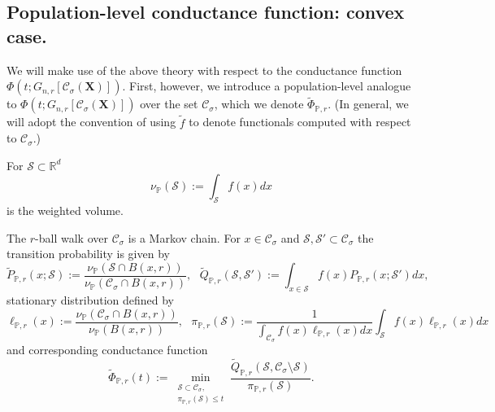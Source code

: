 \documentclass{article}
\newcommand{\Reals}{\mathbb{R}}
\newcommand{\Rd}{\Reals^d}
\newcommand{\1}{\mathbf{1}}
\newcommand{\Xbf}{\mathbf{X}}
\newcommand{\Pbb}{\mathbb{P}}
\newcommand{\Sset}{\mathcal{S}}
\newcommand{\Cset}{\mathcal{C}}
\newcommand{\Csig}{\Cset_{\sigma}}
\theoremstyle{aldenthm}
\begin{document}
\subsection{Population-level conductance function: convex case.}

We will make use of the above theory with respect to the conductance function $\Phi(t; G_{n,r}[\Csig(\Xbf)])$. First, however, we introduce a population-level analogue to $\Phi(t; G_{n,r}[\Csig(\Xbf)])$ over the set $\Csig$, which we denote $\widetilde{\Phi}_{\Pbb,r}$. (In general, we will adopt the convention of using $\widetilde{f}$ to denote functionals computed with respect to $\Csig$.)

For $\Sset \subset \Rd$
\begin{equation*}
\nu_{\Pbb}(\Sset) := \int_{\Sset} f(x) dx
\end{equation*} 
is the weighted volume.

The $r$-ball walk over $\Csig$ is a Markov chain. For $x \in \Csig$ and $\Sset, \Sset' \subset \Csig$ the transition probability is given by
\begin{equation*}
\widetilde{P}_{\Pbb, r}(x;\Sset) := \frac{\nu_\Pbb(\Sset \cap B(x,r))}{\nu_\Pbb(\Csig \cap B(x,r))}, ~~~ \widetilde{Q}_{\Pbb, r}(\Sset, \Sset') := \int_{x \in \Sset} f(x) P_{\Pbb, r}(x;\Sset') dx,
\end{equation*}
stationary distribution defined by
\begin{equation*}
\ell_{\Pbb,r}(x) := \frac{\nu_\Pbb(\Csig \cap B(x,r))}{\nu_{\Pbb}(B(x,r))}, ~~~ \pi_{\Pbb,r}(\Sset) := \frac{1}{\int_{\Csig} f(x) \ell_{\Pbb,r}(x) dx} \int_{\Sset} f(x) \ell_{\Pbb,r}(x) dx
\end{equation*}
and corresponding conductance function
\begin{equation*}
\widetilde{\Phi}_{\Pbb,r}(t) := \min_{\substack{\Sset \subset \Csig, \\ \pi_{\Pbb,r}(\Sset) \leq t} } \frac{\widetilde{Q}_{\Pbb,r}(\Sset, \Csig \setminus \Sset)}{\pi_{\Pbb,r}(\Sset)}.
\end{equation*}
\end{document}
